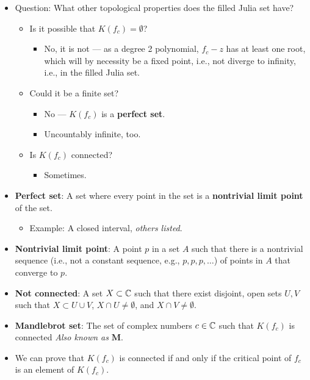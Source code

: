 \documentclass[../apprentice.tex]{subfiles}
\begin{document}
\begin{itemize}
    \item Question: What other topological properties does the filled Julia set have?
    \begin{itemize}
        \item Is it possible that $K(f_c)=\emptyset$?
        \begin{itemize}
            \item No, it is not --- as a degree 2 polynomial, $f_c-z$ has at least one root, which will by necessity be a fixed point, i.e., not diverge to infinity, i.e., in the filled Julia set.
        \end{itemize}
        \item Could it be a finite set?
        \begin{itemize}
            \item No --- $K(f_c)$ is a \textbf{perfect set}.
            \item Uncountably infinite, too.
        \end{itemize}
        \item Is $K(f_c)$ connected?
        \begin{itemize}
            \item Sometimes.
        \end{itemize}
    \end{itemize}
    \item \textbf{Perfect set}: A set where every point in the set is a \textbf{nontrivial limit point} of the set.
    \begin{itemize}
        \item Example: A closed interval, \emph{others listed}.
    \end{itemize}
    \item \textbf{Nontrivial limit point}: A point $p$ in a set $A$ such that there is a nontrivial sequence (i.e., not a constant sequence, e.g., $p,p,p,\dots$) of points in $A$ that converge to $p$.
    \item \textbf{Not connected}: A set $X\subset\mathbb{C}$ such that there exist disjoint, open sets $U,V$ such that $X\subset U\cup V$, $X\cap U\neq\emptyset$, and $X\cap V\neq\emptyset$.
    \item \textbf{Mandlebrot set}: The set of complex numbers $c\in\mathbb{C}$ such that $K(f_c)$ is connected \emph{Also known as} $\bm{M}$.
    \item We can prove that $K(f_c)$ is connected if and only if the critical point of $f_c$ is an element of $K(f_c)$.
    \begin{itemize}

\end{itemize}
\end{itemize}
\end{document}
